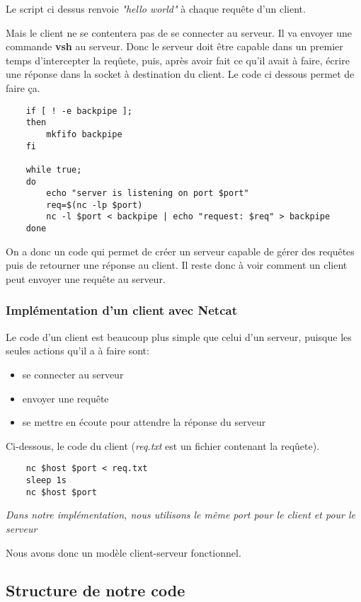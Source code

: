 \documentclass[titlepage]{article}
\begin{document}
	Le script ci dessus renvoie \textit{"hello world"} à chaque requête d'un client.

	Mais le client ne se contentera pas de se connecter au serveur. Il va envoyer une commande \textbf{vsh} au serveur. Donc le serveur doit être capable dans un premier temps d'intercepter la reqûete, puis, après avoir fait ce qu'il avait à faire, écrire une réponse dans la socket à destination du client. Le code ci dessous permet de faire ça. 

	\begin{lstlisting}
	if [ ! -e backpipe ];
	then
	    mkfifo backpipe
	fi

	while true;
	do
	    echo "server is listening on port $port"
	    req=$(nc -lp $port)
	    nc -l $port < backpipe | echo "request: $req" > backpipe
	done
	\end{lstlisting}

	On a donc un code qui permet de créer un serveur capable de gérer des requêtes puis de retourner une réponse au client. Il reste donc à voir comment un client peut envoyer une requête au serveur.

	\subsubsection{Implémentation d'un client avec Netcat}
	Le code d'un client est beaucoup plus simple que celui d'un serveur, puisque les seules actions qu'il a à faire sont:
	\begin{itemize}  
		\item se connecter au serveur 
		\item envoyer une requête
		\item se mettre en écoute pour attendre la réponse du serveur
	\end{itemize}

	Ci-dessous, le code du client (\textit{req.txt} est un fichier contenant la reqûete).

	\begin{lstlisting}
	nc $host $port < req.txt
	sleep 1s
	nc $host $port
	\end{lstlisting}

	\textit{Dans notre implémentation, nous utilisons le même port pour le client et pour le serveur}

	Nous avons donc un modèle client-serveur fonctionnel.

	\subsection{Structure de notre code}
\end{document}
